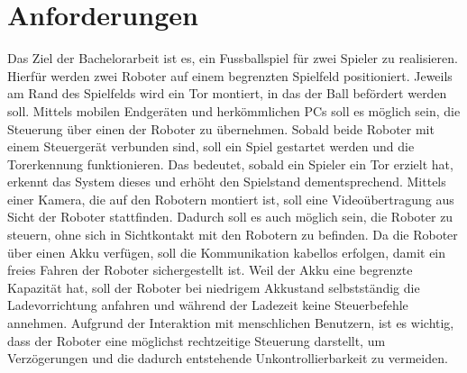 \section{Anforderungen}
Das Ziel der Bachelorarbeit ist es, ein Fussballspiel für zwei Spieler zu realisieren. Hierfür werden zwei Roboter auf einem begrenzten Spielfeld positioniert. Jeweils am Rand des Spielfelds wird ein Tor montiert, in das der Ball befördert werden soll. Mittels mobilen Endgeräten und herkömmlichen PCs soll es möglich sein, die Steuerung über einen der Roboter zu übernehmen. Sobald beide Roboter mit einem Steuergerät verbunden sind, soll ein Spiel gestartet werden und die Torerkennung funktionieren. Das bedeutet, sobald ein Spieler ein Tor erzielt hat, erkennt das System dieses und erhöht den Spielstand dementsprechend. Mittels einer Kamera, die auf den Robotern montiert ist, soll eine Videoübertragung aus Sicht der Roboter stattfinden. Dadurch soll es auch möglich sein, die Roboter zu steuern, ohne sich in Sichtkontakt mit den Robotern zu befinden. Da die Roboter über einen Akku verfügen, soll die Kommunikation kabellos erfolgen, damit ein freies Fahren der Roboter sichergestellt ist. Weil der Akku eine begrenzte Kapazität hat, soll der Roboter bei niedrigem Akkustand selbstständig die Ladevorrichtung anfahren und während der Ladezeit keine Steuerbefehle annehmen. Aufgrund der Interaktion mit menschlichen Benutzern, ist es wichtig, dass der Roboter eine möglichst rechtzeitige Steuerung darstellt, um Verzögerungen und die dadurch entstehende Unkontrollierbarkeit zu vermeiden.


